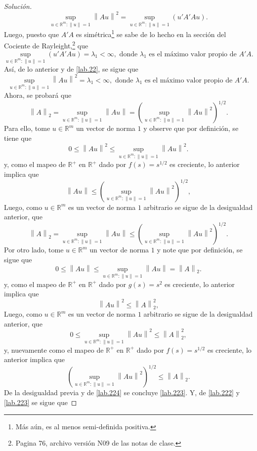 \documentclass[10.5pt,notitlepage]{article}
\newenvironment{solucion}
  {\begin{proof}[Solución]}
  {\end{proof}}
\newcommand{\RR}{\mathbb{R}}
\newcommand{\norm}[1]{\left\| #1 \right\|}
\newcommand{\pare}[1]{\left( #1 \right)}
\theoremstyle{plain}
\begin{document}
\begin{solucion}
\begin{equation}
   \sup_{u\in \RR^{m}: \norm{u} = 1}\norm{Au}^{2} = \sup_{u\in \RR^{m}: \norm{u} = 1}(u'A'A u). 
\end{equation}
Luego, puesto que \(A'A\) es simétrica\footnote{Más aún, es al menos semi-definida positiva.} se sabe de lo hecho en la sección del Cociente de Rayleight,\footnote{Pagina 76, archivo versión N09 de las notas de clase.} que 
\[
 \sup_{u\in \RR^{m}: \norm{u} = 1}(u'A'A u) = \lambda_1 < \infty, \text{ donde } \lambda_1 \text{ es el máximo valor propio de } A'A. 
\]
Así, de lo anterior y de \eqref{lab.22}, se sigue que
\begin{equation}\label{lab.222}
    \sup_{u\in \RR^{m}: \norm{u} = 1}\norm{Au}^2 = \lambda_1 < \infty, \text{ donde } \lambda_1 \text{ es el máximo valor propio de } A'A.  
\end{equation}
Ahora, se probará que 
\begin{equation}\label{lab.223}
      \norm{A}_{2}=\sup_{u\in \RR^{m}: \norm{u} = 1}\norm{Au}=\pare{\sup_{u\in \RR^{m}: \norm{u} = 1}\norm{Au}^2}^{1/2}.
\end{equation}
Para ello, tome \(u \in \RR^{m}\) un vector de norma \(1\) y observe que por definición, se tiene que 
\[
0 \leq \norm{Au}^2 \leq \sup_{u\in \RR^{m}: \norm{u} = 1}\norm{Au}^2.
\]
y, como el mapeo de \(\RR^+\) en \(\RR^+\) dado por \(f(s) = s^{1/2}\) es creciente, lo anterior implica que
\[
\norm{Au}\leq \pare{\sup_{u\in \RR^{m}: \norm{u} = 1}\norm{Au}^2}^{1/2},
\]
Luego, como \(u \in \RR^{m}\) es un vector de norma \(1\) arbitrario se sigue de la desigualdad anterior, que
\begin{equation}\label{lab.224}
\norm{A}_{2}=\sup_{u\in \RR^{m}: \norm{u} = 1}\norm{Au} \leq \pare{\sup_{u\in \RR^{m}: \norm{u} = 1}\norm{Au}^2}^{1/2}.    
\end{equation}
Por otro lado, tome \(u \in \RR^{m}\) un vector de norma \(1\) y note que por definición, se sigue que
\[
0 \leq \norm{Au} \leq \sup_{u\in \RR^{m}: \norm{u} = 1}\norm{Au} = \norm{A}_{2}.
\]
y, como el mapeo de \(\RR^+\) en \(\RR^+\) dado por \(g(s) = s^{2}\) es creciente, lo anterior implica que
\[
 \norm{Au}^2 \leq\norm{A}_{2}^{2},
\]
Luego, como \(u \in \RR^{m}\) es un vector de norma \(1\) arbitrario se sigue de la desigualdad anterior, que
\[
0\leq \sup_{u\in \RR^{m}: \norm{u} = 1}\norm{Au}^2 \leq\norm{A}_{2}^{2},
\]
y, nuevamente como el mapeo de \(\RR^+\) en \(\RR^+\) dado por \(f(s) = s^{1/2}\) es creciente, lo anterior implica que
\[
\pare{\sup_{u\in \RR^{m}: \norm{u} = 1}\norm{Au}^2}^{1/2} \leq  \norm{A}_{2}.
\]
De la desigualdad previa y de \eqref{lab.224} se concluye \eqref{lab.223}. Y, de \eqref{lab.222} y \eqref{lab.223} se sigue que

\end{solucion}
\end{document}
